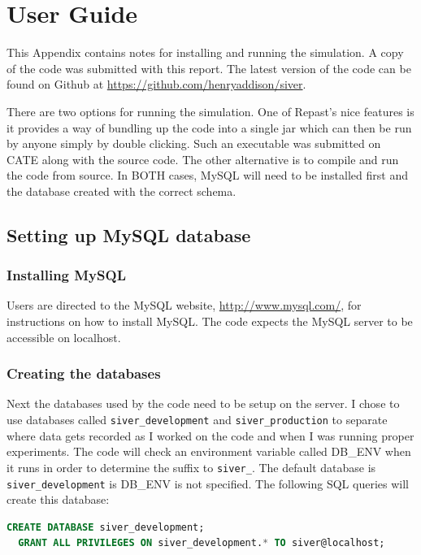 \chapter{User Guide}\label{appendix:user_guide}
This Appendix contains notes for installing and running the simulation. A copy of the code was submitted with this report. The latest version of the code can be found on Github at \url{https://github.com/henryaddison/siver}.

There are two options for running the simulation. One of Repast's nice features is it provides a way of bundling up the code into a single jar which can then be run by anyone simply by double clicking. Such an executable was submitted on CATE along with the source code. The other alternative is to compile and run the code from source. In BOTH cases, MySQL will need to be installed first and the database created with the correct schema.

\section{Setting up MySQL database}

\subsection{Installing MySQL}

Users are directed to the MySQL website, \url{http://www.mysql.com/}, for instructions on how to install MySQL. The code expects the MySQL server to be accessible on localhost.

\subsection{Creating the databases}

Next the databases used by the code need to be setup on the server. I chose to use databases called \texttt{siver\_development} and \texttt{siver\_production} to separate where data gets recorded as I worked on the code and when I was running proper experiments. The code will check an environment variable called DB\_ENV when it runs in order to determine the suffix to \texttt{siver\_}. The default database is \texttt{siver\_development} is DB\_ENV is not specified. The following SQL queries will create this database:

\begin{lstlisting}[language=SQL]
  CREATE DATABASE siver_development;
  GRANT ALL PRIVILEGES ON siver_development.* TO siver@localhost;
\end{lstlisting}

